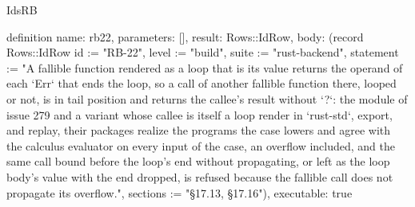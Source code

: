 \begin{lexlean}{IdsRB}
\begin{semanticmodule}
definition{
  name: rb22,
  parameters: [],
  result: Rows::IdRow,
  body: (record Rows::IdRow {id := "RB-22", level := "build", suite := "rust-backend", statement := "A fallible function rendered as a loop that is its value returns the operand of each `Err` that ends the loop, so a call of another fallible function there, looped or not, is in tail position and returns the callee's result without `?`: the module of issue 279 and a variant whose callee is itself a loop render in `rust-std`, export, and replay, their packages realize the programs the case lowers and agree with the calculus evaluator on every input of the case, an overflow included, and the same call bound before the loop's end without propagating, or left as the loop body's value with the end dropped, is refused because the fallible call does not propagate its overflow.", sections := "§17.13, §17.16"}),
  executable: true
}


\end{semanticmodule}
\end{lexlean}
